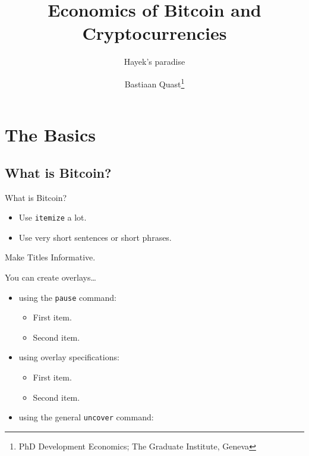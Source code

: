 \documentclass[]{beamer}
\title[] %
{Economics of Bitcoin and Cryptocurrencies}
\subtitle
{Hayek's paradise} %
\author[] %
{Bastiaan Quast\footnote{PhD Development Economics; The Graduate Institute, Geneva}}
\begin{document}
\begin{frame}
  \titlepage
\end{frame}


\section{The Basics}
\subsection{What is Bitcoin?}

\begin{frame}{What is Bitcoin?}

  \begin{itemize}
  \item
    Use \texttt{itemize} a lot.
  \item
    Use very short sentences or short phrases.
  \end{itemize}
\end{frame}

\begin{frame}{Make Titles Informative.}

  You can create overlays\dots
  \begin{itemize}
  \item using the \texttt{pause} command:
    \begin{itemize}
    \item
      First item.
      \pause
    \item    
      Second item.
    \end{itemize}
  \item
    using overlay specifications:
    \begin{itemize}
    \item<3->
      First item.
    \item<4->
      Second item.
    \end{itemize}
  \item
    using the general \texttt{uncover} command:
    \begin{itemize}
    \end{itemize}
  \end{itemize}
\end{frame}
\end{document}
